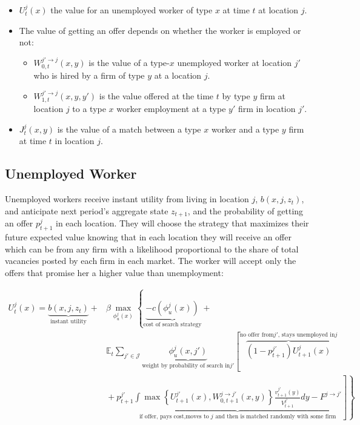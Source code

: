 \documentclass[
  letterpaper,
  DIV=11,
  numbers=noendperiod]{scrreprt}
\providecommand{\tightlist}{%
  \setlength{\itemsep}{0pt}\setlength{\parskip}{0pt}}\usepackage{longtable,booktabs,array}
\begin{document}
\begin{itemize}
\tightlist
\item
  \(U^{j}_t(x)\) the value for an unemployed worker of type \(x\) at
  time \(t\) at location \(j\).
\item
  The value of getting an offer depends on whether the worker is
  employed or not:

  \begin{itemize}
  \tightlist
  \item
    \(W^{j'\to j}_{0, t}(x,y)\) is the value of a type-\(x\) unemployed
    worker at location \(j'\) who is hired by a ﬁrm of type \(y\) at a
    location \(j\).
  \item
    \(W^{j'\to j}_{1, t}(x,y,y')\) is the value offered at the time
    \(t\) by type \(y\) firm at location \(j\) to a type \(x\) worker
    employment at a type \(y'\) firm in location \(j'\).
  \end{itemize}
\item
  \(J^j_t(x,y)\) is the value of a match between a type \(x\) worker and
  a type \(y\) firm at time \(t\) in location \(j\).
\end{itemize}

\hypertarget{unemployed-worker}{%
\subsection{Unemployed Worker}\label{unemployed-worker}}

Unemployed workers receive instant utility from living in location
\(j\), \(b(x,j, z_t)\), and anticipate next period's aggregate state
\(z_{t+1}\), and the probability of getting an offer \(p^j_{t+1}\) in
each location. They will choose the strategy that maximizes their future
expected value knowing that in each location they will receive an offer
which can be from any firm with a likelihood proportional to the share
of total vacancies posted by each firm in each market. The worker will
accept only the offers that promise her a higher value than
unemployment:

\begin{align*}
U^{j}_{t}(x) = \underbrace{b(x,j,z_t)}_{\text{instant utility}} + &\beta\max_{\phi^j_u(x)}\left\{ \underbrace{-c(\phi^j_u(x))}_{\text{cost of search strategy}} \right.  + \\
& \mathbb{E}_{t}\sum_{j'\in \mathcal{J}} \underbrace{\phi^j_u(x, j')}_{\text{weight by probability of search in} j'}\left[ \overbrace{(1-p^{j'}_{t+1})U^{j}_{t+1}(x)}^{\text{no offer from} j' \text{, stays unemployed in} j} \right.  \\
& \left. \left. \hspace{0cm} + p^{j'}_{t+1} \underbrace{\int \max\left\{U^{j'}_{t+1}(x),W^{j\to j'}_{0, t+1}(x,y)\right\}\frac{v^{j'}_{t+1}(y)}{V^{j'}_{t+1}}dy - F^{j \to j'}}_{\text{if offer, pays cost,moves to } j \text{ and then is matched randomly with some firm}} \right] \right\} 
\end{align*}
\end{document}
